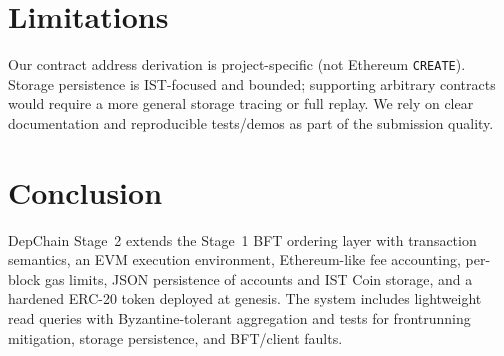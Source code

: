 \documentclass[runningheads]{llncs}
\begin{document}
\section{Limitations}
Our contract address derivation is project-specific (not Ethereum \texttt{CREATE}). Storage persistence is IST-focused and bounded; supporting arbitrary contracts
would require a more general storage tracing or full replay. We rely on clear documentation and reproducible tests/demos as part of the submission quality.

\section{Conclusion}
DepChain Stage~2 extends the Stage~1 BFT ordering layer with transaction semantics, an EVM execution environment, Ethereum-like fee accounting,
per-block gas limits, JSON persistence of accounts and IST Coin storage, and a hardened ERC-20 token deployed at genesis.
The system includes lightweight read queries with Byzantine-tolerant aggregation and tests for frontrunning mitigation, storage persistence, and BFT/client faults.



\end{document}
